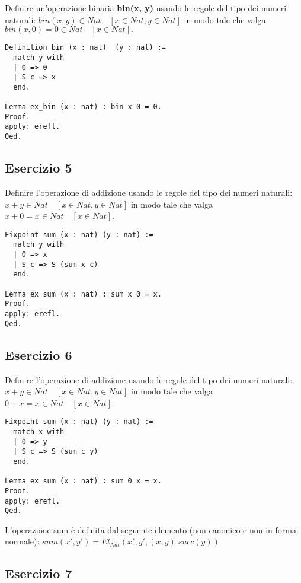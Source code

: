 Definire un'operazione binaria \textbf{bin(x, y)} usando le regole del tipo dei numeri
naturali: $bin(x, y) \in Nat \quad [x \in Nat, y \in Nat]$
in modo tale che valga $bin(x, 0) = 0 \in Nat \quad [x \in Nat].$

\begin{lstlisting}[language=Coq]
Definition bin (x : nat)  (y : nat) :=
  match y with
  | 0 => 0
  | S c => x
  end.

Lemma ex_bin (x : nat) : bin x 0 = 0.
Proof.
apply: erefl.
Qed.
\end{lstlisting}

\subsection{Esercizio 5}

Definire l'operazione di addizione usando le regole del tipo dei numeri naturali:
$x + y \in Nat \quad [x \in Nat, y \in Nat]$
in modo tale che valga $x + 0 = x \in Nat \quad [x \in Nat]$.

\begin{lstlisting}[language=Coq]
Fixpoint sum (x : nat) (y : nat) :=
  match y with
  | 0 => x
  | S c => S (sum x c)
  end.

Lemma ex_sum (x : nat) : sum x 0 = x.
Proof.
apply: erefl.
Qed.
\end{lstlisting}

\subsection{Esercizio 6}

Definire l'operazione di addizione usando le regole del tipo dei numeri naturali:
$x + y \in Nat \quad [x \in Nat, y \in Nat]$
in modo tale che valga $0 + x = x \in Nat \quad [x \in Nat]$.

\begin{lstlisting}[language=Coq]
Fixpoint sum (x : nat) (y : nat) :=
  match x with
  | 0 => y
  | S c => S (sum c y)
  end.

Lemma ex_sum (x : nat) : sum 0 x = x.
Proof.
apply: erefl.
Qed.
\end{lstlisting}

L'operazione sum è definita dal seguente elemento (non canonico e non in
forma normale): $sum(x',y') = El_{Nat}(x',y',(x,y).succ(y))$

\subsection{Esercizio 7}

